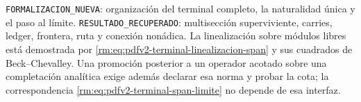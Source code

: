 \begin{statusbox}
\texttt{FORMALIZACION\_NUEVA}: organizaci\'on del terminal completo, la
naturalidad \'unica y el paso al l\'imite.\quad
\texttt{RESULTADO\_RECUPERADO}: multisecci\'on superviviente, carries,
ledger, frontera, ruta y conexi\'on non\'adica.\quad
La linealización sobre módulos libres está demostrada por
\eqref{rm:eq:pdfv2-terminal-linealizacion-span} y sus cuadrados de
Beck--Chevalley. Una promoción posterior a un operador acotado sobre una
completación analítica exige además declarar esa norma y probar la cota; la
correspondencia \eqref{rm:eq:pdfv2-terminal-span-limite} no depende de esa
interfaz.
\end{statusbox}

